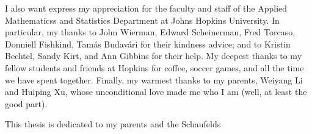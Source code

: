 \begin{frontmatter}
\begin{acknowledgment}
I also want express my appreciation for the faculty and staff of the Applied Mathematicss and Statistics Department at Johns Hopkins University. In particular, my thanks to John Wierman,  Edward Scheinerman,  Fred Torcaso, Donniell Fishkind, Tam\'{a}s Budav\'{a}ri for their kindness advice; and to Kristin Bechtel, Sandy Kirt, and Ann Gibbins for their help.
My deepest thanks to my fellow students and friends at Hopkins for coffee, soccer games, and all the time we have spent together.
Finally, my warmest thanks to my parents, Weiyang Li and Huiping Xu, whose unconditional love made me who I am (well, at least the good part). 

\end{acknowledgment}

\begin{dedication}
 
This thesis is dedicated to my parents and the Schaufelds

\end{dedication}

\tableofcontents

\listoftables

\listoffigures

\end{frontmatter}

